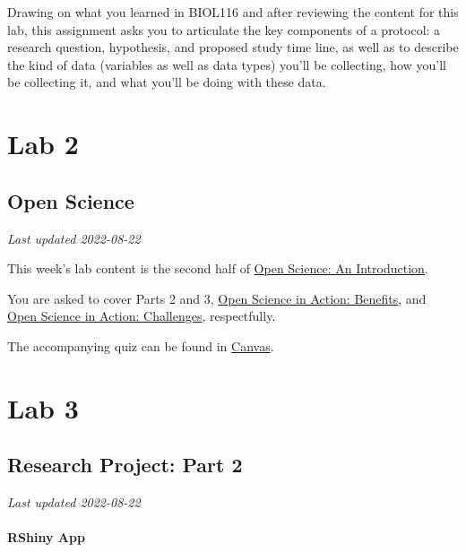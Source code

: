 \documentclass[
]{book}
\begin{document}
Drawing on what you learned in BIOL116 and after reviewing the content for this lab, this assignment asks you to articulate the key components of a protocol: a research question, hypothesis, and proposed study time line, as well as to describe the kind of data (variables as well as data types) you'll be collecting, how you'll be collecting it, and what you'll be doing with these data.

\hypertarget{part-lab-2}{%
\part*{Lab 2}\label{part-lab-2}}

\hypertarget{open-science}{%
\chapter*{Open Science}\label{open-science}}

\emph{Last updated 2022-08-22}

This week's lab content is the second half of \href{https://ubco-biology.github.io/OS-Introduction/}{Open Science: An Introduction}.

You are asked to cover Parts 2 and 3, \href{https://ubco-biology.github.io/OS-Introduction/open-science-in-action-benefits.html}{Open Science in Action: Benefits}, and \href{https://ubco-biology.github.io/OS-Introduction/open-science-in-action-challenges.html}{Open Science in Action: Challenges}, respectfully.

The accompanying quiz can be found in \href{https://canvas.ubc.ca/courses/94573}{Canvas}.

\hypertarget{part-lab-3}{%
\part*{Lab 3}\label{part-lab-3}}

\hypertarget{research-project-part-2}{%
\chapter*{Research Project: Part 2}\label{research-project-part-2}}

\emph{Last updated 2022-08-22}

\hypertarget{rshiny-app}{%
\subsection*{RShiny App}\label{rshiny-app}}
\end{document}
